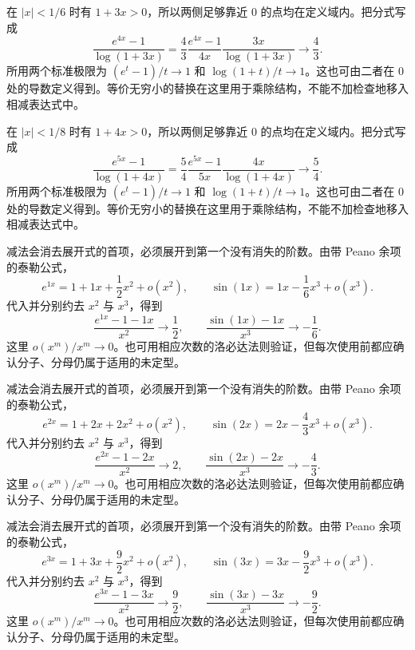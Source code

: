 \documentclass[UTF8,12pt,a4paper,fontset=fandol]{ctexart}
\begin{document}
\begin{solve}\label{ans:c3q18}
在 $|x|<1/6$ 时有 $1+3x>0$，所以两侧足够靠近 $0$ 的点均在定义域内。把分式写成
\[
\frac{e^{4x}-1}{\log(1+3x)}=\frac{4}{3}\frac{e^{4x}-1}{4x}\frac{3x}{\log(1+3x)}\longrightarrow \frac{4}{3}.
\]
所用两个标准极限为 $(e^t-1)/t\to1$ 和 $\log(1+t)/t\to1$。这也可由二者在 $0$ 处的导数定义得到。等价无穷小的替换在这里用于乘除结构，不能不加检查地移入相减表达式中。
\end{solve}

\begin{solve}\label{ans:c3q19}
在 $|x|<1/8$ 时有 $1+4x>0$，所以两侧足够靠近 $0$ 的点均在定义域内。把分式写成
\[
\frac{e^{5x}-1}{\log(1+4x)}=\frac{5}{4}\frac{e^{5x}-1}{5x}\frac{4x}{\log(1+4x)}\longrightarrow \frac{5}{4}.
\]
所用两个标准极限为 $(e^t-1)/t\to1$ 和 $\log(1+t)/t\to1$。这也可由二者在 $0$ 处的导数定义得到。等价无穷小的替换在这里用于乘除结构，不能不加检查地移入相减表达式中。
\end{solve}

\begin{solve}\label{ans:c3q20}
减法会消去展开式的首项，必须展开到第一个没有消失的阶数。由带 Peano 余项的泰勒公式，
\[
e^{1x}=1+1x+\frac{1}{2}x^2+o(x^2),\qquad\sin(1x)=1x-\frac{1}{6}x^3+o(x^3).
\]
代入并分别约去 $x^2$ 与 $x^3$，得到
\[
\frac{e^{1x}-1-1x}{x^2}\to \frac{1}{2},\qquad\frac{\sin(1x)-1x}{x^3}\to-\frac{1}{6}.
\]
这里 $o(x^m)/x^m\to0$。也可用相应次数的洛必达法则验证，但每次使用前都应确认分子、分母仍属于适用的未定型。
\end{solve}

\begin{solve}\label{ans:c3q21}
减法会消去展开式的首项，必须展开到第一个没有消失的阶数。由带 Peano 余项的泰勒公式，
\[
e^{2x}=1+2x+2x^2+o(x^2),\qquad\sin(2x)=2x-\frac{4}{3}x^3+o(x^3).
\]
代入并分别约去 $x^2$ 与 $x^3$，得到
\[
\frac{e^{2x}-1-2x}{x^2}\to 2,\qquad\frac{\sin(2x)-2x}{x^3}\to-\frac{4}{3}.
\]
这里 $o(x^m)/x^m\to0$。也可用相应次数的洛必达法则验证，但每次使用前都应确认分子、分母仍属于适用的未定型。
\end{solve}

\begin{solve}\label{ans:c3q22}
减法会消去展开式的首项，必须展开到第一个没有消失的阶数。由带 Peano 余项的泰勒公式，
\[
e^{3x}=1+3x+\frac{9}{2}x^2+o(x^2),\qquad\sin(3x)=3x-\frac{9}{2}x^3+o(x^3).
\]
代入并分别约去 $x^2$ 与 $x^3$，得到
\[
\frac{e^{3x}-1-3x}{x^2}\to \frac{9}{2},\qquad\frac{\sin(3x)-3x}{x^3}\to-\frac{9}{2}.
\]
这里 $o(x^m)/x^m\to0$。也可用相应次数的洛必达法则验证，但每次使用前都应确认分子、分母仍属于适用的未定型。
\end{solve}
\end{document}
